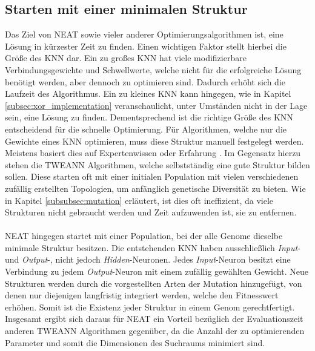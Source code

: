 \subsection{Starten mit einer minimalen Struktur}
\label{subsec:neat_minimal_structure}
Das Ziel von \ac{NEAT} sowie vieler anderer Optimierungsalgorithmen ist, eine Lösung in kürzester Zeit zu finden. Einen wichtigen Faktor stellt hierbei die Größe des \ac{KNN} dar. Ein zu großes \ac{KNN} hat viele modifizierbare Verbindungsgewichte und Schwellwerte, welche nicht für die erfolgreiche Lösung benötigt werden, aber dennoch zu optimieren sind. Dadurch erhöht sich die Laufzeit des Algorithmus. Ein zu kleines \ac{KNN} kann hingegen, wie in Kapitel \ref{subsec:xor_implementation} veranschaulicht, unter Umständen nicht in der Lage sein, eine Lösung zu finden. Dementsprechend ist die richtige Größe des \ac{KNN} entscheidend für die schnelle Optimierung. Für Algorithmen, welche nur die Gewichte eines \ac{KNN} optimieren, muss diese Struktur manuell festgelegt werden. Meistens basiert dies auf Expertenwissen oder Erfahrung \cite{stanley2017oreilly}. Im Gegensatz hierzu stehen die \ac{TWEANN} Algorithmen, welche selbstständig eine gute Struktur bilden sollen. Diese starten oft mit einer initialen Population mit vielen verschiedenen zufällig erstellten Topologien, um anfänglich genetische Diversität zu bieten. Wie in Kapitel \ref{subsubsec:mutation} erläutert, ist dies oft ineffizient, da viele Strukturen nicht gebraucht werden und Zeit aufzuwenden ist, sie zu entfernen.
\\\\
\ac{NEAT} hingegen startet mit einer Population, bei der alle Genome dieselbe minimale Struktur besitzen. Die entstehenden \ac{KNN} haben ausschließlich \emph{Input}- und \emph{Output}-, nicht jedoch \emph{Hidden}-Neuronen. Jedes \emph{Input}-Neuron besitzt eine Verbindung zu jedem \emph{Output}-Neuron mit einem zufällig gewählten Gewicht. Neue Strukturen werden durch die vorgestellten Arten der Mutation hinzugefügt, von denen nur diejenigen langfristig integriert werden, welche den Fitnesswert erhöhen. Somit ist die Existenz jeder Struktur in einem Genom gerechtfertigt. Insgesamt ergibt sich daraus für \ac{NEAT} ein Vorteil bezüglich der Evaluationszeit anderen \ac{TWEANN} Algorithmen gegenüber, da die Anzahl der zu optimierenden Parameter und somit die Dimensionen des Suchraums minimiert sind.